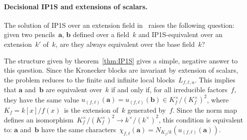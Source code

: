 \documentclass{article}%
\begin{document}
\paragraph{Decisional IP1S and extensions of scalars.}

The solution of IP1S over an extension field
in~\cite{DBLP:journals/corr/BerthomieuFP13} raises the following
question: given two pencils~$\bm{a}$, $\bm{b}$ defined over a field~$k$
and IP1S-equivalent over an extension~$k'$ of~$k$, are they always
equivalent over the base field~$k$?

The structure given by theorem~\ref{thm:IP1S}
gives a simple, negative answer to this question.
Since the Kronecker blocks are invariant by extension of scalars,
the problem reduces to the finite and infinite local blocks~$L_{f,ℓ,u}$.
This implies that $\bm{a}$ and~$\bm{b}$ are equivalent over~$k$
if and only if, for all irreducible factors~$f$, they have the same value
$u_{(f, ℓ)} (\bm{a}) = u_{(f, ℓ)} (\bm{b}) ∈ K_f^{×}/(K_f^{×})^2$,
where $K_f = k[x]/f(x)$~is the extension of~$k$ generated by~$f$.
Since the norm map defines
an isomorphism~$K_f^{×}/(K_f^{×})^{2} → k^{×} / (k^{×})^2$,
this condition is equivalent to: $\bm{a}$ and~$\bm{b}$ have the same
characters~$χ_{f,ℓ} (\bm{a}) = N_{K_f/k} (u_{(f,ℓ)} (\bm{a}))$.

% 
\end{document}
